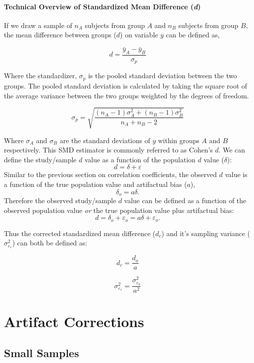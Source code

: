 \documentclass[
  letterpaper,
  DIV=11,
  numbers=noendperiod]{scrreprt}
\begin{document}
\hypertarget{technical-overview-of-standardized-mean-difference-d}{%
\subsection{\texorpdfstring{Technical Overview of Standardized Mean
Difference
(\emph{d})}{Technical Overview of Standardized Mean Difference (d)}}\label{technical-overview-of-standardized-mean-difference-d}}

If we draw a sample of \(n_A\) subjects from group \(A\) and \(n_B\)
subjects from group \(B\), the mean difference between groups (\(d\)) on
variable \(y\) can be defined as,

\[
d=\frac{\bar{y}_A - \bar{y}_B}{\sigma_p}
\]

Where the standardizer, \(\sigma_p\) is the pooled standard deviation
between the two groups. The pooled standard deviation is calculated by
taking the square root of the average variance between the two groups
weighted by the degrees of freedom.

\[
\sigma_p=\sqrt{\frac{(n_A-1)\sigma^2_{A} + (n_B-1)\sigma^2_{B}}{n_A + n_B - 2}}
\]

Where \(\sigma_{A}\) and \(\sigma_{B}\) are the standard deviations of
\(y\) within groups \(A\) and \(B\) respectively. This SMD estimator is
commonly referred to as Cohen's \(d\). We can define the study/sample
\(d\) value as a function of the population \(d\) value (\(\delta\)): \[
d = \delta + \varepsilon
\] Similar to the previous section on correlation coefficients, the
observed \(d\) value is a function of the true population value and
artifactual bias (\(a\)), \[
\delta_o = a\delta.
\] Therefore the observed study/sample \(d\) value can be defined as a
function of the observed population value \emph{or} the true population
value plus artifactual bias: \[
d = \delta_o + \varepsilon_o = a\delta + \varepsilon_o.
\]

Thus the corrected standardized mean difference (\(d_c\)) and it's
sampling variance (\(\sigma^2_{\varepsilon_c}\)) can both be defined as:

\[
d_c = \frac{d_o}{a}
\]

\[
\sigma^2_{\varepsilon_c} = \frac{\sigma^2_{\varepsilon_o}}{a^2}
\]

\part{Artifact Corrections}

\hypertarget{sec-small_samples}{%
\chapter{Small Samples}\label{sec-small_samples}}
\end{document}
